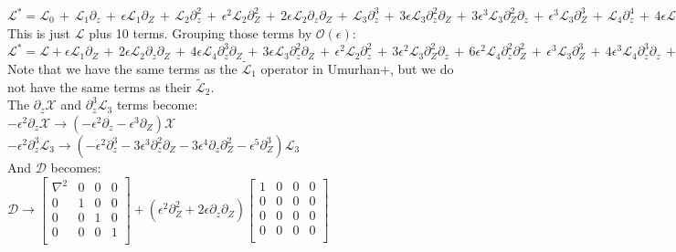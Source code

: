 \documentclass[letterpaper,12pt]{article}
\begin{document}
$\mathcal{L^*} = \mathcal{L}_0 \, + \, \mathcal{L}_1\partial_z \,+ \, \epsilon\mathcal{L}_1 \partial_Z \, + \, \mathcal{L}_2\partial_z^2 \, + \, \epsilon^2\mathcal{L}_2\partial_Z^2 \, + \, 2\epsilon\mathcal{L}_2\partial_z\partial_Z \, + \, \mathcal{L}_3\partial_z^3 \, +\, 3\epsilon \mathcal{L}_3 \partial_z^2 \partial_Z \,+\, 3 \epsilon^3\mathcal{L}_3\partial_Z^2\partial_z \,+\, \epsilon^3\mathcal{L}_3\partial_Z^3 \, + \, \mathcal{L}_4\partial_z^4 \, + \, 4 \epsilon \mathcal{L}_4 \partial_z^3 \partial_Z \, + \, 6 \epsilon^2\mathcal{L}_4 \partial_z^2 \partial_Z^2 \, + \, 4 \epsilon^3 \mathcal{L}_4 \partial_Z^3\partial_z \, + \, \epsilon^4\mathcal{L}_4\partial_Z^4$ \\

This is just $\mathcal{L}$ plus 10 terms. Grouping those terms by $\mathcal{O}(\epsilon)$: \\

$\mathcal{L^*} = \mathcal{L} + \epsilon\mathcal{L}_1\partial_Z \, + \, 2\epsilon\mathcal{L}_2\partial_z\partial_Z \, + \, 4 \epsilon\mathcal{L}_4\partial_z^3 \partial_Z \, + \, 3\epsilon\mathcal{L}_3\partial_z^2\partial_Z \, + \, \epsilon^2\mathcal{L}_2\partial_z^2 \, + \, 3\epsilon^2\mathcal{L}_3\partial_Z^2\partial_z \, + \, 6\epsilon^2\mathcal{L}_4 \partial_z^2 \partial_Z^2 \, + \, \epsilon^3\mathcal{L}_3\partial_Z^3 \, + \, 4 \epsilon^3\mathcal{L}_4\partial_z^3 \partial_z \, + \, \epsilon^4\mathcal{L}_4\partial_Z^4 $ \\

Note that we have the same terms as the $\widetilde{\mathcal{L}}_1$ operator in Umurhan+, but we do not have the same terms as their $\widetilde{\mathcal{L}}_2$. \\

The $\partial_z\mathcal{X}$ and $\partial_z^3\mathcal{L}_3$ terms become: \\

$-\epsilon^2\partial_z\mathcal{X} \to \left(-\epsilon^2\partial_z - \epsilon^3\partial_Z\right)\mathcal{X}$ \\

$-\epsilon^2\partial_z^3\mathcal{L}_3 \to \left(-\epsilon^2\partial_z^3 - 3\epsilon^3\partial_z^2\partial_Z - 3\epsilon^4\partial_z\partial_Z^2 - \epsilon^5\partial_Z^3\right)\mathcal{L}_3$ \\

And $\mathcal{D}$ becomes: \\

$\mathcal{D} \to \left[\begin{matrix}
\nabla^2 & 0 & 0 & 0 \\
0 & 1& 0 & 0 \\
0 & 0 & 1 & 0\\
0 & 0 & 0 & 1 \\
\end{matrix}\right] + \left(\epsilon^2\partial_Z^2 + 2\epsilon\partial_z\partial_Z\right)\left[\begin{matrix}
1 & 0 & 0 & 0 \\
0 & 0 & 0 & 0 \\
0 & 0 & 0 & 0 \\
0 & 0 & 0 & 0 \\ \end{matrix}\right]$ \\
\end{document}
